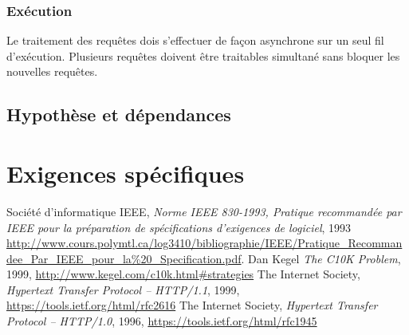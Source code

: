 \documentclass{scrreprt}
\begin{document}
\subsection{Exécution}
Le traitement des requêtes dois s'effectuer de façon asynchrone sur un seul fil
d'exécution. Plusieurs requêtes doivent être traitables simultané sans bloquer
les nouvelles requêtes.

\section{Hypothèse et dépendances}
\chapter{Exigences spécifiques}

\begin{thebibliography}{9}
  Société d'informatique IEEE,
\emph{Norme IEEE 830-1993, Pratique recommandée par IEEE pour la préparation de
spécifications d’exigences de logiciel}, 1993
\url{http://www.cours.polymtl.ca/log3410/bibliographie/IEEE/Pratique_Recommandee_Par_IEEE_pour_la%20_Specification.pdf}.
  Dan Kegel
\emph{The C10K Problem}, 1999, \url{http://www.kegel.com/c10k.html#strategies}
    The Internet Society,
\emph{Hypertext Transfer Protocol -- HTTP/1.1}, 1999,
\url{https://tools.ietf.org/html/rfc2616}
    The Internet Society,
\emph{Hypertext Transfer Protocol -- HTTP/1.0}, 1996,
\url{https://tools.ietf.org/html/rfc1945}
\end{thebibliography}

\end{document}

